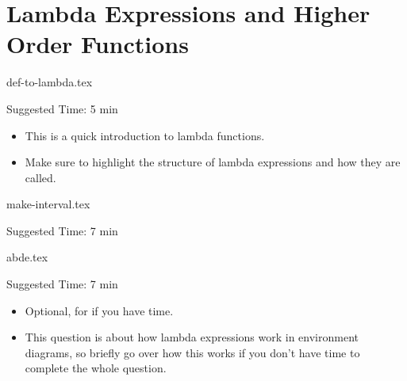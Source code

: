 \documentclass{exam}
\begin{document}
\section{Lambda Expressions and Higher Order Functions}
\begin{questions}
    {def-to-lambda.tex}
    \begin{questionmeta}
        Suggested Time: 5 min
        \begin{itemize}
            \item This is a quick introduction to lambda functions. 
            \item Make sure to highlight the structure of lambda expressions and how they are called.
        \end{itemize}
    \end{questionmeta}

    {make-interval.tex}
    \begin{questionmeta}
        Suggested Time:  7 min
    \end{questionmeta}

    {abde.tex}
    \begin{questionmeta}
    Suggested Time: 7 min
    \begin{itemize}
            \item Optional, for if you have time. 
            \item This question is about how lambda expressions work in environment diagrams, so briefly go over how this works if you don't have time to complete the whole question.
        \end{itemize}
    \end{questionmeta}

\end{questions}
\end{document}
